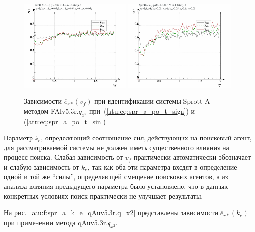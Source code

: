 \begin{figure}[h!]
  \centerline{
    \includegraphics[width=0.49\textwidth]{p/cha/spr_a/FAlv5.3A/sprott_a_FAlv5x3r-p_v_f_e_sign.png}
    \hfill
    \includegraphics[width=0.49\textwidth]{p/cha/spr_a/FAlv5.3A/sprott_a_FAlv5x3r-p_v_f_e_sin.png}
  }
  \caption{Зависимости $\overline{e}_{r*}(v_f)$ при идентификации системы Sprott A методом FAlv5.3r.$q_{x^2}$
   при~(\ref{atu:eq:spr_a_po_t_sign}) и (\ref{atu:eq:spr_a_po_t_sin})}
  \label{atu:f:spr_a_v_f_FAlv5.3r.q_x2}
\end{figure}

Параметр $k_e$, определяющий соотношение сил, действующих
на поисковый агент, для рассматриваемой системы не должен
иметь существенного влияния на процесс поиска.
Слабая зависимость от $v_f$ практически автоматически обозначает
и слабую зависимость от $k_e$, так как оба эти параметра
входят в определение одной и той же ``силы'',
определяющей смещение поисковых агентов, а из
анализа влияния предыдущего параметра было установлено,
что в данных конкретных условиях поиск практически не улучшает результаты.


На рис.~\ref{atu:f:spr_a_k_e_qAuv5.3r.q_x2} представлены зависимости
$\overline{e}_{r*}(k_e)$ при применении метода qAuv5.3r.$q_{x^2}$.

